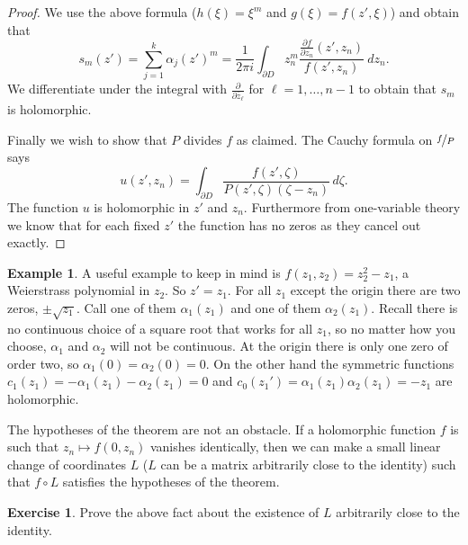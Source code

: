 \documentclass[12pt,openany]{book}
\theoremstyle{plain}
\theoremstyle{remark}
\theoremstyle{definition}
\newenvironment{exbox}{%
    \def\FrameCommand{\vrule width 1pt \relax\hspace {10pt}}%
    \MakeFramed {\advance \hsize -\width \FrameRestore }%
}{%
    \endMakeFramed
}
\theoremstyle{exercise}
\newtheorem{exercise}{Exercise}[section]
\theoremstyle{example}
\newtheorem{example}[thm]{Example}
\begin{document}
\begin{proof}
We use the above formula ($h(\xi) = \xi^m$ and $g(\xi)=f(z',\xi)$) and obtain that
\begin{equation*}
s_m(z') = 
\sum_{j=1}^k \alpha_j{(z')}^m
=
\frac{1}{2\pi i}
\int_{\partial D}
z_n^m
\frac{\frac{\partial f}{\partial z_n} (z',z_n)}{f(z',z_n)} ~dz_n .
\end{equation*}
We differentiate under the integral
with $\frac{\partial}{\partial\bar{z}_\ell}$
for $\ell=1,\ldots,{n-1}$
to obtain that $s_m$
is holomorphic.

Finally we wish to show that $P$ divides $f$ as claimed.  The Cauchy
formula on $\nicefrac{f}{P}$ says
\begin{equation*}
u(z',z_n) = \int_{\partial D} \frac{f(z',\zeta)}{P(z',\zeta)(\zeta-z_n)} \, d\zeta .
\end{equation*}
The function $u$ is holomorphic in $z'$ and $z_n$.  Furthermore from
one-variable theory we know that for each fixed $z'$ the function has no zeros
as they cancel out exactly.
\end{proof}

\begin{example} \label{sqrt:example}
A useful example to keep in mind is $f(z_1,z_2) = z_2^2 - z_1$,
a Weierstrass polynomial in $z_2$.  So $z' = z_1$.
For all $z_1$ except the origin there are two zeros, $\pm \sqrt{z_1}$.
Call one of them $\alpha_1(z_1)$ and one of them $\alpha_2(z_1)$.  Recall
there is no continuous choice of a square root that works for all $z_1$,
so no matter how you choose, $\alpha_1$ and $\alpha_2$ will not be continuous.
At the origin there is only one zero of order two,
so $\alpha_1(0) = \alpha_2(0) = 0$.
On the other hand the
symmetric functions $c_1(z_1) = - \alpha_1(z_1) - \alpha_2(z_1) = 0$
and $c_0(z_1') = \alpha_1(z_1)\alpha_2(z_1) = -z_1$ are holomorphic.
\end{example}



The hypotheses of the theorem are not an obstacle.  If a holomorphic
function $f$ is such that $z_n \mapsto f(0,z_n)$ vanishes identically,
then we can make a small linear change of
coordinates $L$ ($L$ can be a matrix arbitrarily close to the identity) such
that $f \circ L$ satisfies the hypotheses of the theorem.

\begin{exbox}
\begin{exercise}
Prove the above fact about the existence of $L$ arbitrarily close to the
identity.
\end{exercise}
\end{exbox}
\end{document}
